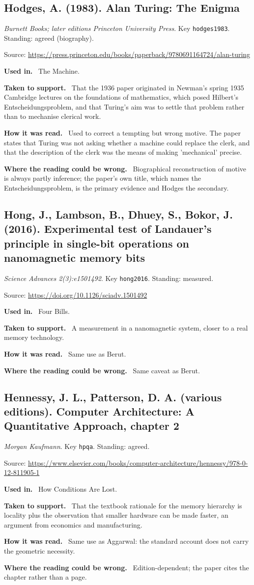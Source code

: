 \documentclass[11pt,oneside]{article}
\newcommand{\field}[1]{\par\noindent\textbf{\color{accent}#1.}\ }
\begin{document}
\subsection*{Hodges, A. (1983). Alan Turing: The Enigma}
\noindent\small\emph{Burnett Books; later editions Princeton University Press}. Key \texttt{hodges1983}. Standing: agreed (biography).
\par\noindent\small Source: \url{https://press.princeton.edu/books/paperback/9780691164724/alan-turing}
\normalsize
\field{Used in} The Machine.
\field{Taken to support} That the 1936 paper originated in Newman's spring 1935 Cambridge lectures on the foundations of mathematics, which posed Hilbert's Entscheidungsproblem, and that Turing's aim was to settle that problem rather than to mechanise clerical work.
\field{How it was read} Used to correct a tempting but wrong motive. The paper states that Turing was not asking whether a machine could replace the clerk, and that the description of the clerk was the means of making 'mechanical' precise.
\field{Where the reading could be wrong} Biographical reconstruction of motive is always partly inference; the paper's own title, which names the Entscheidungsproblem, is the primary evidence and Hodges the secondary.

\hypertarget{src:hong2016}{}
\subsection*{Hong, J., Lambson, B., Dhuey, S., Bokor, J. (2016). Experimental test of Landauer's principle in single-bit operations on nanomagnetic memory bits}
\noindent\small\emph{Science Advances 2(3):e1501492}. Key \texttt{hong2016}. Standing: measured.
\par\noindent\small Source: \url{https://doi.org/10.1126/sciadv.1501492}
\normalsize
\field{Used in} Four Bills.
\field{Taken to support} A measurement in a nanomagnetic system, closer to a real memory technology.
\field{How it was read} Same use as Berut.
\field{Where the reading could be wrong} Same caveat as Berut.

\hypertarget{src:hpqa}{}
\subsection*{Hennessy, J. L., Patterson, D. A. (various editions). Computer Architecture: A Quantitative Approach, chapter 2}
\noindent\small\emph{Morgan Kaufmann}. Key \texttt{hpqa}. Standing: agreed.
\par\noindent\small Source: \url{https://www.elsevier.com/books/computer-architecture/hennessy/978-0-12-811905-1}
\normalsize
\field{Used in} How Conditions Are Lost.
\field{Taken to support} That the textbook rationale for the memory hierarchy is locality plus the observation that smaller hardware can be made faster, an argument from economics and manufacturing.
\field{How it was read} Same use as Aggarwal: the standard account does not carry the geometric necessity.
\field{Where the reading could be wrong} Edition-dependent; the paper cites the chapter rather than a page.
\end{document}
